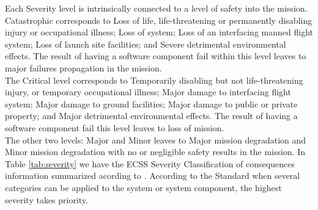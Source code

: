 Each Severity level is intrinsically connected to a level of safety into the mission. Catastrophic corresponds to
Loss of life, life-threatening or permanently disabling injury or occupational illness; Loss of system; 
Loss of an interfacing manned flight system; Loss of launch site facilities; and Severe detrimental environmental effects. The result
of having a software component fail within this level leaves to major failures propagation in the mission\cite{ecss-q-st-30c}.\\
The Critical level corresponds to Temporarily disabling but not life-threatening injury, or temporary occupational illness;
Major damage to interfacing flight system; Major damage to ground facilities; Major damage to public or private property;
and Major detrimental environmental effects. The result of having a software component fail this level leaves to loss of mission.\\
The other two levels: Major and Minor leaves to Major mission degradation and Minor mission degradation with no or negligible safety results in the mission.
In Table \ref{tab:severity} we have the \ac{ECSS} Severity Classification of consequences information summarized acording to \cite{ecss-q-st-40c}.
According to the Standard
when several categories can be applied to the system or system component, the highest severity takes priority.
